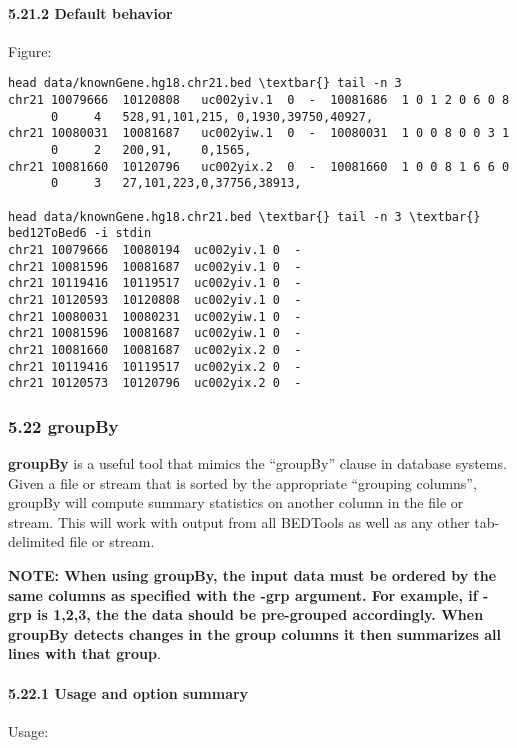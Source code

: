\documentclass[letterpaper,10pt,english]{sphinxmanual}
\begin{document}
\paragraph{5.21.2 Default behavior}
\label{content/bed12ToBed6:default-behavior}
Figure:

\begin{Verbatim}[commandchars=\\\{\}]
head data/knownGene.hg18.chr21.bed \textbar{} tail -n 3
chr21 10079666  10120808   uc002yiv.1  0  -  10081686  1 0 1 2 0 6 0 8
      0     4   528,91,101,215, 0,1930,39750,40927,
chr21 10080031  10081687   uc002yiw.1  0  -  10080031  1 0 0 8 0 0 3 1
      0     2   200,91,    0,1565,
chr21 10081660  10120796   uc002yix.2  0  -  10081660  1 0 0 8 1 6 6 0
      0     3   27,101,223,0,37756,38913,

head data/knownGene.hg18.chr21.bed \textbar{} tail -n 3 \textbar{} bed12ToBed6 -i stdin
chr21 10079666  10080194  uc002yiv.1 0  -
chr21 10081596  10081687  uc002yiv.1 0  -
chr21 10119416  10119517  uc002yiv.1 0  -
chr21 10120593  10120808  uc002yiv.1 0  -
chr21 10080031  10080231  uc002yiw.1 0  -
chr21 10081596  10081687  uc002yiw.1 0  -
chr21 10081660  10081687  uc002yix.2 0  -
chr21 10119416  10119517  uc002yix.2 0  -
chr21 10120573  10120796  uc002yix.2 0  -
\end{Verbatim}


\subsubsection{5.22 groupBy}
\label{content/groupBy::doc}\label{content/groupBy:groupby}
\textbf{groupBy} is a useful tool that mimics the ``groupBy'' clause in database systems. Given a file or stream
that is sorted by the appropriate ``grouping columns'', groupBy will compute summary statistics on
another column in the file or stream. This will work with output from all BEDTools as well as any other
tab-delimited file or stream.

\textbf{NOTE: When using groupBy, the input data must be ordered by the same
columns as specified with the -grp argument. For example, if -grp is 1,2,3, the the
data should be pre-grouped accordingly. When groupBy detects changes in the
group columns it then summarizes all lines with that group}.


\paragraph{5.22.1 Usage and option summary}
\label{content/groupBy:usage-and-option-summary}
Usage:
\end{document}

